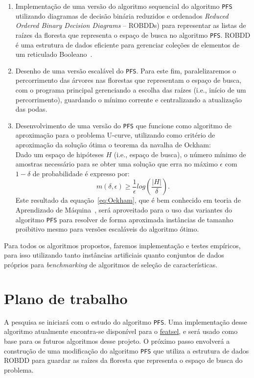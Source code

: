 \documentclass[12pt]{article}
\begin{document}
\begin{enumerate}
\item Implementação de uma versão do algoritmo sequencial do algoritmo 
{\tt PFS} utilizando diagramas de decisão binária reduzidos e ordenados
{\em Reduced Ordered Binary Decision Diagrams} -- ROBDDs) para 
representar as listas de raízes da floresta que representa o espaço de
busca no algoritmo {\tt PFS}. ROBDD é uma estrutura de dados eficiente 
para gerenciar coleções de elementos de um reticulado 
Booleano~\cite{bryant}.

\item Desenho de uma versão escalável do {\tt PFS}. Para este fim, 
paralelizaremos o percorrimento das árvores nas florestas que 
representam o espaço de busca, com o programa principal gerenciando a 
escolha das raízes (i.e., início de um percorrimento), guardando o 
mínimo corrente e centralizando a atualização das podas.

\item Desenvolvimento de uma versão do {\tt PFS} que funcione como algoritmo 
de aproximação para o problema U-curve, utilizando como critério de
aproximação da solução ótima o teorema da navalha de Ockham:\\
\smallskip
Dado um espaço de hipóteses $H$ (i.e., espaço de busca), o número mínimo 
de amostras necessário para se obter uma solução que erra no máximo 
$\epsilon$ com $1 - \delta$ de probabilidade é expresso por:
\begin{equation}
\displaystyle  m(\delta,\epsilon) \ge 
    \frac{1}{\epsilon} log (\frac{|H|}{\delta}). \label{eq:Ockham}
\end{equation}
Este resultado da equação~\ref{eq:Ockham}, que é bem conhecido em teoria
de Aprendizado de Máquina~\cite{kearns}, será aproveitado para o uso das
variantes do algoritmo {\tt PFS} para resolver de forma aproximada 
instâncias de tamanho proibitivo mesmo para versões escaláveis do
algoritmo ótimo.
\end{enumerate}

Para todos os algoritmos propostos, faremos implementação e testes 
empíricos, para isso utilizando tanto instâncias artificiais quanto 
conjuntos de dados próprios para {\em benchmarking} de algoritmos de 
seleção de características.


\section{Plano de trabalho}
A pesquisa se iniciará com o estudo do algoritmo {\tt PFS}. Uma 
implementação desse algoritmo atualmente encontra-se disponível para o  
\href{https://github.com/msreis/featsel}{featsel}, e será 
usado como base para os futuros algoritmos desse projeto. O próximo 
passo envolverá a construção de uma modificação do algoritmo {\tt PFS}
que utiliza a estrutura de dados ROBDD para guardar as raízes da 
floresta que representa o espaço de busca do problema.
\end{document}
